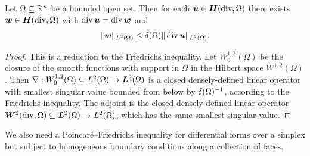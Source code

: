 \documentclass[10pt,a4paper]{article}
\begin{document}
\begin{lemma}\label{lemma:PFfordivergence}
    Let $\Omega \subseteq {\mathbb R}^{n}$ be a bounded open set. 
    Then for each $\bm{u} \in \bm{H}(\operatorname{div},\Omega)$ there exists $\bm{w} \in \bm{H}(\operatorname{div},\Omega)$ with $\operatorname{div} \bm{u} = \operatorname{div} \bm{w}$ and 
    \begin{align*}
        \| \bm{w} \|_{L^{2}(\Omega)} 
        \leq 
        {\delta}(\Omega) \| \operatorname{div} \bm{u} \|_{L^{2}(\Omega)}
        .
    \end{align*}
\end{lemma}
\begin{proof}
    This is a reduction to the Friedrichs inequality. 
    Let $W^{1,2}_{0}(\Omega)$ be the closure of the smooth functions with support in $\Omega$ in the Hilbert space $W^{1,2}(\Omega)$. 
    Then $\nabla : W^{1,2}_{0}(\Omega) \subseteq L^{2}(\Omega) \rightarrow \bm{L}^{2}(\Omega)$ is a closed densely-defined linear operator 
    with smallest singular value bounded from below by ${\delta}(\Omega)^{-1}$, according to the Friedrichs inequality. 
    The adjoint is the closed densely-defined linear operator $\bm{W}^{2}(\operatorname{div},\Omega) \subseteq \bm{L}^{2}(\Omega) \rightarrow L^{2}(\Omega)$,
    which has the same smallest singular value. 
\end{proof}






We also need a Poincar\'e--Friedrichs inequality for differential forms over a simplex but subject to homogeneous boundary conditions along a collection of faces. 
\end{document}
